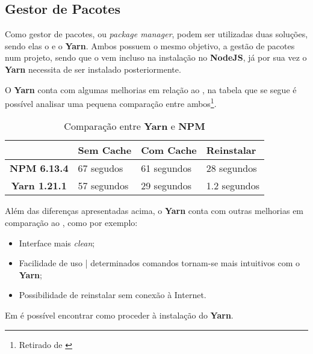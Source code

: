 \subsection{Gestor de Pacotes}

Como gestor de pacotes, ou \textit{package manager}, podem ser utilizadas duas soluções, sendo elas o \textbf{} e o \textbf{Yarn}. Ambos possuem o mesmo objetivo, a gestão de pacotes num projeto, sendo que o \textbf{} vem incluso na instalação no \textbf{NodeJS}, já por sua vez o \textbf{Yarn} necessita de ser instalado posteriormente.

O \textbf{Yarn} conta com algumas melhorias em relação ao \textbf{}, na tabela que se segue é possível analisar uma pequena comparação entre ambos\footnote{Retirado de \cite{yarnVSNpm}}.

\begin{table}[h!]
	\renewcommand{\arraystretch}{1.25}
	\centering
	\begin{tabularx}{.85\textwidth}{ |c X X X| }
		\rowcolor{estg} & {\color[HTML]{FFFFFF} \textbf{Sem Cache}} & 	{\color[HTML]{FFFFFF} \textbf{Com Cache}} & {\color[HTML]{FFFFFF} \textbf{Reinstalar}} \\\hline


		\textbf{NPM 6.13.4} & 67 segudos & 61 segundos & 28 segundos \\\hline
		\textbf{Yarn 1.21.1} & 57 segundos & 29 segundos & 1.2 segundos \\\hline
	\end{tabularx}

	\caption{Comparação entre \textbf{Yarn} e \textbf{NPM}}
\end{table}

Além das diferenças apresentadas acima, o \textbf{Yarn} conta com outras melhorias em comparação ao \textbf{}, como por exemplo:

\begin{itemize}
	\item Interface mais \textit{clean};
	\item Facilidade de uso | determinados comandos tornam-se mais intuitivos com o \textbf{Yarn};
	\item Possibilidade de reinstalar  sem conexão à Internet.
\end{itemize}


Em  é possível encontrar como proceder à instalação do \textbf{Yarn}.